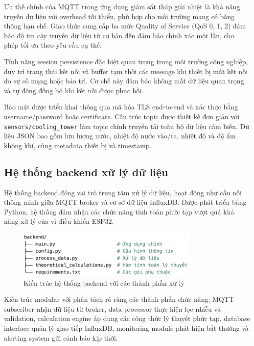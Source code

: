 \documentclass[../main.tex]{subfiles}
\begin{document}
Ưu thế chính của MQTT trong ứng dụng giám sát tháp giải nhiệt là khả năng truyền dữ liệu với overhead tối thiểu, phù hợp cho môi trường mạng có băng thông hạn chế. Giao thức cung cấp ba mức Quality of Service (QoS 0, 1, 2) đảm bảo độ tin cậy truyền dữ liệu từ cơ bản đến đảm bảo chính xác một lần, cho phép tối ưu theo yêu cầu cụ thể.

Tính năng session persistence đặc biệt quan trọng trong môi trường công nghiệp, duy trì trạng thái kết nối và buffer tạm thời các message khi thiết bị mất kết nối do sự cố mạng hoặc bảo trì. Cơ chế này đảm bảo không mất dữ liệu quan trọng và tự động đồng bộ khi kết nối được phục hồi.

Bảo mật được triển khai thông qua mã hóa TLS end-to-end và xác thực bằng username/password hoặc certificate. Cấu trúc topic được thiết kế đơn giản với \texttt{sensors/cooling\_tower} làm topic chính truyền tải toàn bộ dữ liệu cảm biến. Dữ liệu JSON bao gồm lưu lượng nước, nhiệt độ nước vào/ra, nhiệt độ và độ ẩm không khí, cùng metadata thiết bị và timestamp.

\subsection{Hệ thống backend xử lý dữ liệu}
\label{sec:backend_system}

Hệ thống backend đóng vai trò trung tâm xử lý dữ liệu, hoạt động như cầu nối thông minh giữa MQTT broker và cơ sở dữ liệu InfluxDB. Được phát triển bằng Python, hệ thống đảm nhận các chức năng tính toán phức tạp vượt quá khả năng xử lý của vi điều khiển ESP32.

\begin{figure} [H]
    \centering
    \includegraphics[width=0.8\textwidth]{../Hinhve/backend.png}
    \caption{Kiến trúc hệ thống backend với các thành phần xử lý}
    \label{fig:backend_architecture}
\end{figure}

Kiến trúc modular với phân tách rõ ràng các thành phần chức năng: MQTT subscriber nhận dữ liệu từ broker, data processor thực hiện lọc nhiễu và validation, calculation engine áp dụng các công thức lý thuyết phức tạp, database interface quản lý giao tiếp InfluxDB, monitoring module phát hiện bất thường và alerting system gửi cảnh báo kịp thời.
\end{document}
